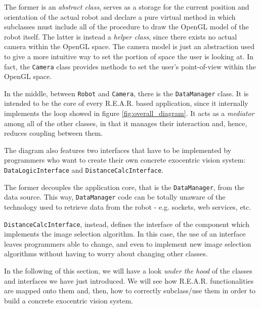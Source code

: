 %
The former is an \textit{abstract class}, serves as a storage 
for the current position and orientation of the actual
robot and declare a pure virtual method in which subclasses 
must include all of the procedure to draw the OpenGL model 
of the robot itself.
%
The latter is instead a \textit{helper class}, since there 
exists no actual camera within the OpenGL space. The camera 
model is just an abstraction used to give a more intuitive
way to set the portion of space the user is looking at.
In fact, the \texttt{Camera} class provides methods to 
set the user's point-of-view within the OpenGL space.
%

%
In the middle, between \texttt{Robot} and \texttt{Camera},
there is the \texttt{DataManager} class. It is intended to be 
the core of every \textsf{R.E.A.R.} based application, since it 
internally implements the loop showed in figure 
\ref{fig:overall_diagram}.
It acts as a \textit{mediator} among all of the other classes, 
in that it manages their interaction and, hence, reduces 
coupling between them.
%

%
The diagram also features two interfaces that have to be implemented 
by programmers who want to create their own concrete exocentric 
vision system: \texttt{DataLogicInterface} and 
\texttt{DistanceCalcInterface}.
%

%
The former decouples the application 
core, that is the \texttt{DataManager}, from the data source.
This way, \texttt{DataManager} code can be totally unaware of 
the technology used to retrieve data from the robot - e.g. 
sockets, web services, etc.
%

%
\texttt{DistanceCalcInterface}, instead, defines the interface 
of the component which implements the image selection algorithm.
%
In this case, the use of an interface leaves programmers 
able to change, and even to implement new image 
selection algorithms without having to worry about
changing other classes.
%

%
In the following of this section, we will have a look 
\textit{under the hood} of the classes and interfaces 
we have just introduced.
%
We will see how \textsf{R.E.A.R.} functionalities are 
mapped onto them and, then, how to correctly subclass/use
them in order to build a concrete exocentric vision system.
%

%
